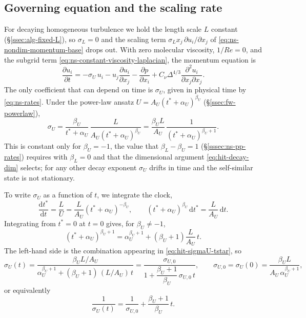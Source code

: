\documentclass{article}
\begin{document}
\subsection{Governing equation and the scaling rate}\label{ssec:hit-sigma}
For decaying homogeneous turbulence we hold the length scale $L$ constant
(\S\ref{ssec:alg-fixed-L}), so
$\sigma_L = 0$ and the scaling term $\sigma_L x_j\, \partial u_i/\partial x_j$
of \eqref{eq:ns-nondim-momentum-base} drops out. With zero molecular viscosity,
$1/Re = 0$, and the subgrid term \eqref{eq:ns-constant-viscosity-laplacian}, the
momentum equation is
\begin{equation}\label{eq:hit-momentum}
  \frac{\partial u_i}{\partial t}
  =  - \sigma_U\, u_i
  - u_j \frac{\partial u_i}{\partial x_j}
  - \frac{\partial p}{\partial x_i}
  + C_\nu\Delta^{4/3}\frac{\partial^2 u_i}{\partial x_j \partial x_j}.
\end{equation}
The only coefficient that can depend on time is $\sigma_U$, given in physical
time by \eqref{eq:ns-rates}. Under the power-law ansatz $U = A_U (t^* + \alpha_U)^{\beta_U}$
(\S\ref{ssec:fw-powerlaw}),
\begin{equation}\label{eq:hit-sigmaU-tstar}
  \sigma_U = \frac{\beta_U}{t^* + \alpha_U}\, \frac{L}{A_U(t^* + \alpha_U)^{\beta_U}}
  = \frac{\beta_U L}{A_U}\, \frac{1}{(t^* + \alpha_U)^{\beta_U + 1}} .
\end{equation}
This is constant only for $\beta_U = -1$, the value that
$\beta_L - \beta_U = 1$ (\S\ref{sssec:ns-pp-rates}) requires with
$\beta_L = 0$ and that the dimensional argument \eqref{eq:hit-decay-dim}
selects; for any other decay exponent $\sigma_U$ drifts in time and
the self-similar state is not stationary.
\par
To write $\sigma_U$ as a function of $t$, we integrate the clock,
\begin{equation}
  \frac{\mathrm{d} t^*}{\mathrm{d} t} = \frac{L}{U} = \frac{L}{A_U}(t^* + \alpha_U)^{-\beta_U},
  \qquad
  (t^* + \alpha_U)^{\beta_U}\, \mathrm{d} t^* = \frac{L}{A_U}\, \mathrm{d} t .
\end{equation}
Integrating from $t^* = 0$ at $t = 0$ gives, for $\beta_U \neq -1$,
\begin{equation}\label{eq:hit-tstar-of-t}
  (t^* + \alpha_U)^{\beta_U + 1}
  = \alpha_U^{\beta_U + 1} + (\beta_U + 1)\frac{L}{A_U}\, t .
\end{equation}
The left-hand side is the combination appearing in
\eqref{eq:hit-sigmaU-tstar}, so
\begin{equation}\label{eq:hit-sigmaU-t}
  \sigma_U(t) = \frac{\beta_U L / A_U}{\alpha_U^{\beta_U + 1} + (\beta_U + 1)\, (L/A_U)\, t}
  = \frac{\sigma_{U,0}}{1 + \dfrac{\beta_U + 1}{\beta_U}\, \sigma_{U,0}\, t},
  \qquad
  \sigma_{U,0} = \sigma_U(0) = \frac{\beta_U L}{A_U\, \alpha_U^{\beta_U + 1}} ,
\end{equation}
or equivalently
\begin{equation}\label{eq:hit-inv-sigmaU-t}
  \frac{1}{\sigma_U(t)} = \frac{1}{\sigma_{U,0}} + \frac{\beta_U + 1}{\beta_U}\, t .
\end{equation}
\end{document}
